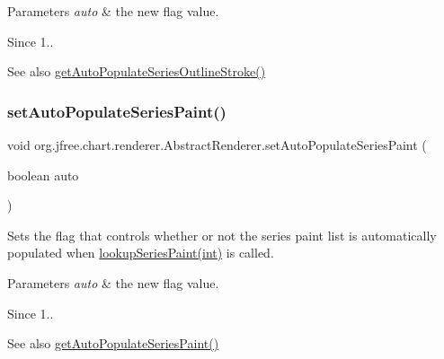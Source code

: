 \begin{DoxyParams}{Parameters}
{\em auto} & the new flag value.\\
\hline
\end{DoxyParams}
\begin{DoxySince}{Since}
1..
\end{DoxySince}
\begin{DoxySeeAlso}{See also}
\mbox{\hyperlink{classorg_1_1jfree_1_1chart_1_1renderer_1_1_abstract_renderer_a0bee4fb1848ef723f35ddd8085c5f1ce}{get\+Auto\+Populate\+Series\+Outline\+Stroke()}} 
\end{DoxySeeAlso}
\mbox{\label{classorg_1_1jfree_1_1chart_1_1renderer_1_1_abstract_renderer_a2ae58cd16b4f7c6f6b741bf47a5af5fb}} 
\subsubsection{\texorpdfstring{set\+Auto\+Populate\+Series\+Paint()}{setAutoPopulateSeriesPaint()}}
{\footnotesize\ttfamily void org.\+jfree.\+chart.\+renderer.\+Abstract\+Renderer.\+set\+Auto\+Populate\+Series\+Paint (\begin{DoxyParamCaption}\item[{boolean}]{auto }\end{DoxyParamCaption})}

Sets the flag that controls whether or not the series paint list is automatically populated when \mbox{\hyperlink{classorg_1_1jfree_1_1chart_1_1renderer_1_1_abstract_renderer_abc231547c7d2059d6158ac21bb5826cf}{lookup\+Series\+Paint(int)}} is called.


\begin{DoxyParams}{Parameters}
{\em auto} & the new flag value.\\
\hline
\end{DoxyParams}
\begin{DoxySince}{Since}
1..
\end{DoxySince}
\begin{DoxySeeAlso}{See also}
\mbox{\hyperlink{classorg_1_1jfree_1_1chart_1_1renderer_1_1_abstract_renderer_ad5056b1fd510436f90654a32c97dafd2}{get\+Auto\+Populate\+Series\+Paint()}} 
\end{DoxySeeAlso}
\mbox{\label{classorg_1_1jfree_1_1chart_1_1renderer_1_1_abstract_renderer_abb8c6c6a7bf35579a1bb6284d2a70c1c}} 
